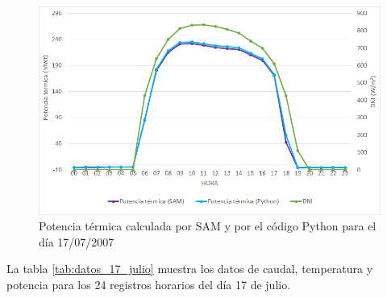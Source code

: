 \begin{figure}[H]
\includegraphics[width=0.9\linewidth]{images/177potencia.png}
\caption{Potencia térmica calculada por SAM y por el código Python para el día 17/07/2007} 
\label{fig:177potencia}
\end{figure}

La tabla \ref{tab:datos_17_julio} muestra los datos de caudal, temperatura y potencia para los 24 registros horarios del día 17 de julio.

